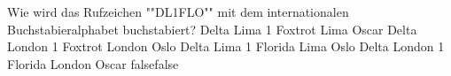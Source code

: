     {Wie wird das Rufzeichen ""DL1FLO"" mit dem internationalen Buchstabieralphabet  buchstabiert?}
    {Delta Lima 1 Foxtrot Lima Oscar}
    {Delta London 1 Foxtrot London Oslo}
    {Delta Lima 1 Florida Lima Oslo}
    {Delta London 1 Florida London Oscar}
    {false}{false}